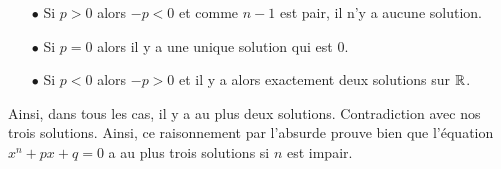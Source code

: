 \documentclass[a4paper, 11pt,reqno]{article}
\begin{document}
\begin{correction}
\begin{itemize}
		      \begin{itemize}
			      \item[$\bullet$] Si $p>0$ alors $-p<0$ et comme $n-1$ est pair, il n'y a aucune solution.
			      \item[$\bullet$]  Si $p=0$ alors il y a une unique solution qui est 0.
			      \item[$\bullet$]  Si $p<0$ alors $-p>0$ et il y a alors exactement deux solutions sur $\mathbb{R}$.
		      \end{itemize}
		      Ainsi, dans tous les cas, il y a au plus deux solutions. Contradiction avec nos trois solutions. Ainsi, ce raisonnement par l'absurde prouve bien que l'\'equation $x^n+px+q=0$ a au plus trois solutions si $n$ est impair.
	\end{itemize}
\end{correction}
\end{document}
